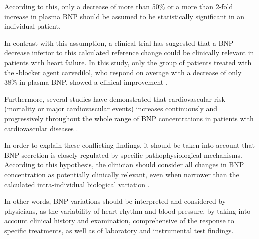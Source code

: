 \documentclass[14pt,a4paper,onecolumn]{extarticle}
\begin{document}
According to this, only a decrease of more than 50\% or a more than 2-fold increase in plasma BNP should be assumed to be statistically significant in an individual patient.

In contrast with this assumption, a clinical trial \citep{bib390} has suggested that a BNP decrease inferior to this calculated reference change could be clinically relevant in patients with heart failure. In this study, only the group of patients treated with the \beta-blocker agent carvedilol, who respond on average with a decrease of only 38\% in plasma BNP, showed a clinical improvement \citep{bib390}.

Furthermore, several studies have demonstrated that cardiovascular risk (mortality or major cardiovascular events) increases continuously and progressively throughout the whole range of BNP concentrations in patients with cardiovascular diseases \citep{bib35} \citep{bib377} \citep{bib378} \citep{bib3194}.

In order to explain these conflicting findings, it should be taken into account that BNP secretion is closely regulated by specific pathophysiological mechanisms.  According to this hypothesis, the clinician should consider all changes in BNP concentration as potentially clinically relevant, even when narrower than the calculated intra-individual biological variation \citep{bib3103}.

In other words, BNP variations should be interpreted and considered by physicians, as the variability of heart rhythm and blood pressure, by taking into account clinical history and examination, comprehensive of the response to specific treatments, as well as of laboratory and instrumental test findings.


\end{document}
